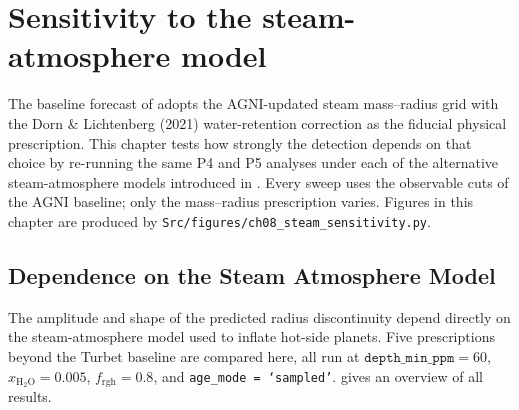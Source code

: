 \chapter{Sensitivity to the steam-atmosphere model}
\label{chap:steam_sensitivity}

The baseline forecast of  adopts the AGNI-updated
steam mass--radius grid with the Dorn \& Lichtenberg (2021) water-retention
correction as the fiducial physical prescription.  This chapter tests how
strongly the \HZIED detection depends on that choice by re-running the
same P4 and P5 analyses under each of the alternative steam-atmosphere
models introduced in .  Every sweep uses the
observable cuts of the AGNI baseline; only the mass--radius prescription
varies.  Figures in this chapter are produced by
\texttt{Src/figures/ch08\_steam\_sensitivity.py}.


\label{ssec:relaxed_depth}


\section{Dependence on the Steam Atmosphere Model}
\label{sec:steam_model}

The amplitude and shape of the predicted radius discontinuity depend
directly on the steam-atmosphere model used to inflate hot-side planets.
Five prescriptions beyond the Turbet baseline are compared here, all run
at $\texttt{depth\_min\_ppm} = 60$, $x_{\mathrm{H_2O}} = 0.005$,
$f_{\mathrm{rgh}} = 0.8$, and \texttt{age\_mode = `sampled'}.
 gives an overview of all results.

